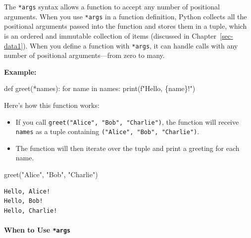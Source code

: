 \documentclass[
  letterpaper,
  DIV=11,
  numbers=noendperiod]{scrreprt}
\let\oldparagraph\paragraph
\renewcommand{\paragraph}[1]{\oldparagraph{#1}\mbox{}}
\newenvironment{Shaded}{\begin{snugshade}}{\end{snugshade}}
\newcommand{\BuiltInTok}[1]{\textcolor[rgb]{0.00,0.23,0.31}{#1}}
\newcommand{\ControlFlowTok}[1]{\textcolor[rgb]{0.00,0.23,0.31}{#1}}
\newcommand{\KeywordTok}[1]{\textcolor[rgb]{0.00,0.23,0.31}{#1}}
\newcommand{\NormalTok}[1]{\textcolor[rgb]{0.00,0.23,0.31}{#1}}
\newcommand{\OperatorTok}[1]{\textcolor[rgb]{0.37,0.37,0.37}{#1}}
\newcommand{\SpecialCharTok}[1]{\textcolor[rgb]{0.37,0.37,0.37}{#1}}
\newcommand{\SpecialStringTok}[1]{\textcolor[rgb]{0.13,0.47,0.30}{#1}}
\newcommand{\StringTok}[1]{\textcolor[rgb]{0.13,0.47,0.30}{#1}}
\providecommand{\tightlist}{%
  \setlength{\itemsep}{0pt}\setlength{\parskip}{0pt}}\usepackage{longtable,booktabs,array}
\begin{document}
The \texttt{*args} syntax allows a function to accept any number of
positional arguments. When you use \texttt{*args} in a function
definition, Python collects all the positional arguments passed into the
function and stores them in a tuple, which is an ordered and immutable
collection of items (discussed in Chapter~\ref{sec-data1}). When you
define a function with \texttt{*args}, it can handle calls with any
number of positional arguments---from zero to many.

\textbf{Example:}

\begin{Shaded}
\begin{Highlighting}[]
\KeywordTok{def}\NormalTok{ greet(}\OperatorTok{*}\NormalTok{names):}
    \ControlFlowTok{for}\NormalTok{ name }\KeywordTok{in}\NormalTok{ names:}
        \BuiltInTok{print}\NormalTok{(}\SpecialStringTok{f"Hello, }\SpecialCharTok{\{}\NormalTok{name}\SpecialCharTok{\}}\SpecialStringTok{!"}\NormalTok{)}
\end{Highlighting}
\end{Shaded}

Here's how this function works:

\begin{itemize}
\tightlist
\item
  If you call \texttt{greet("Alice",\ "Bob",\ "Charlie")}, the function
  will receive \texttt{names} as a tuple containing
  \texttt{("Alice",\ "Bob",\ "Charlie")}.
\item
  The function will then iterate over the tuple and print a greeting for
  each name.
\end{itemize}

\begin{Shaded}
\begin{Highlighting}[]
\NormalTok{greet(}\StringTok{"Alice"}\NormalTok{, }\StringTok{"Bob"}\NormalTok{, }\StringTok{"Charlie"}\NormalTok{)}
\end{Highlighting}
\end{Shaded}

\begin{verbatim}
Hello, Alice!
Hello, Bob!
Hello, Charlie!
\end{verbatim}

\hypertarget{when-to-use-args}{%
\paragraph{\texorpdfstring{When to Use
\texttt{*args}}{When to Use *args}}\label{when-to-use-args}}
\end{document}

